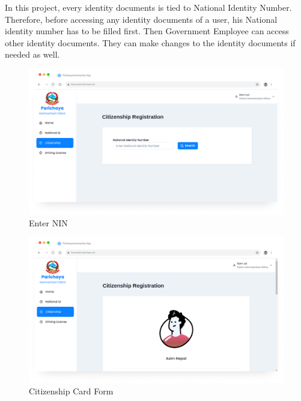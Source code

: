     In this project, every identity documents is tied to National Identity Number. Therefore, before accessing any identity documents of a user, his National identity number has to be filled first. Then Government Employee can access other identity documents. They can make changes to the identity documents if needed as well. 


        \begin{figure}[H]
        \centering
        \includegraphics[width=0.8\linewidth]{images/results/web/WebCitizenshipRegistration1.png}
        \caption[Enter NIN]{Enter NIN}
        \label{fig:WebCitizenshipRegistration1.png}
        \end{figure}

           \begin{figure}[H]
        \centering
        \includegraphics[width=0.8\linewidth]{images/results/web/WebCitizenshipRegistration2.png}
        \caption[Citizenship Card Form]{Citizenship Card Form}
        \label{fig:WebCitizenshipRegistration2.png}
        \end{figure}


